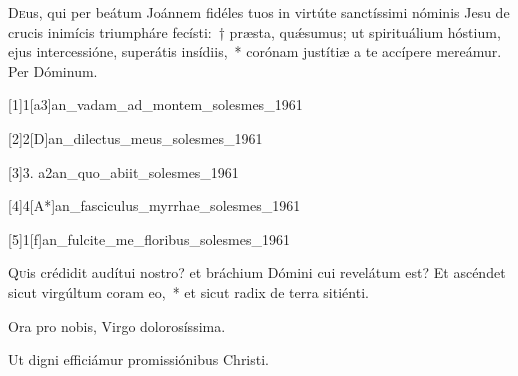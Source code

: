 \documentclass[vesperale_romanum.tex]{subfiles}
\begin{document}

\semiduplexmtv


\oratio

\lettrine{D}{e}us, qui per beátum Joánnem fidéles tuos in virtúte san\-ctíssimi nóminis Jesu de crucis inimícis triumpháre fecísti:~† præsta, quǽsumus; ut spirituálium hóstium, ejus intercessióne, superátis insídiis,~* corónam justítiæ a te accípere mereámur. Per Dóminum.

\commferiae

\myrule

\vspace{0.25\baselineskip}


\duplexmajus


[1]{1}[a3]{an_vadam_ad_montem_solesmes_1961}

[2]{2}[D]{an_dilectus_meus_solesmes_1961}

[3]{3. a2}{an_quo_abiit_solesmes_1961}

[4]{4}[A*]{an_fasciculus_myrrhae_solesmes_1961}

[5]{1}[f]{an_fulcite_me_floribus_solesmes_1961}


\lettrine{Q}{u}is crédidit audítui nostro? et bráchium Dómini cui revelátum est? Et ascéndet sicut virgúltum coram eo,~* et sicut radix de terra sitiénti.

\hymnus


\vv Ora pro nobis, Virgo dolorosíssima.

\rr Ut digni efficiámur promissiónibus Christi.
\end{document}
